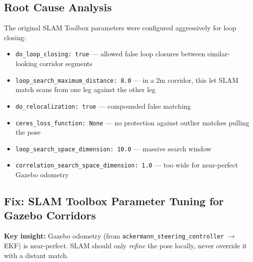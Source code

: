 \documentclass[11pt]{article}
\newcommand{\logentry}[1]{\subsection*{#1}}
\begin{document}
\logentry{Root Cause Analysis}
The original SLAM Toolbox parameters were configured aggressively for loop closing:
\begin{itemize}
  \item \texttt{do\_loop\_closing: true} --- allowed false loop closures between
    similar-looking corridor segments
  \item \texttt{loop\_search\_maximum\_distance: 8.0} --- in a 2m corridor, this
    let SLAM match scans from one leg against the other leg
  \item \texttt{do\_relocalization: true} --- compounded false matching
  \item \texttt{ceres\_loss\_function: None} --- no protection against outlier
    matches pulling the pose
  \item \texttt{loop\_search\_space\_dimension: 10.0} --- massive search window
  \item \texttt{correlation\_search\_space\_dimension: 1.0} --- too wide for
    near-perfect Gazebo odometry
\end{itemize}

\logentry{Fix: SLAM Toolbox Parameter Tuning for Gazebo Corridors}
\textbf{Key insight:} Gazebo odometry (from \texttt{ackermann\_steering\_controller}
$\to$ EKF) is near-perfect. SLAM should only \emph{refine} the pose locally,
never override it with a distant match.
\end{document}
